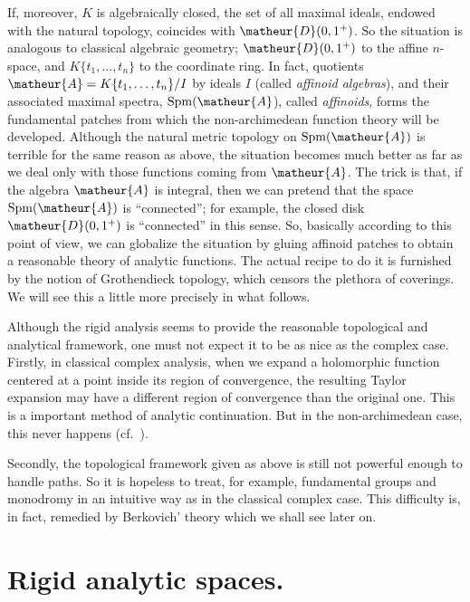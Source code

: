 If, moreover, $K$ is algebraically closed, the set of all maximal
ideals, endowed with the natural topology, coincides with 
$\matheur{D}(0,1^{+})$.
So the situation is analogous to classical algebraic geometry; 
$\matheur{D}(0,1^{+})$ to the affine $n$-space, and $K\{t_1,\ldots,t_n\}$
to the coordinate ring.
In fact, quotients $\matheur{A}=K\{t_1,\ldots,t_n\}/I$ by ideals $I$ 
(called {\it affinoid algebras}), and their associated maximal spectra,
$\mathrm{Spm}(\matheur{A}$), called {\it affinoids}, forms the 
fundamental patches from which the non-archimedean function theory will be
developed.
Although the natural metric topology on $\mathrm{Spm}(\matheur{A})$ is 
terrible for the same reason as above, the situation becomes much
better as far as we deal only with those functions coming from 
$\matheur{A}$.
The trick is that, if the algebra $\matheur{A}$ is integral, then we can
pretend that the space $\mathrm{Spm}(\matheur{A})$ is ``connected''; for
example, the closed disk $\matheur{D}(0,1^{+})$ is ``connected'' in this
sense.
So, basically according to this point of view, we can globalize 
the situation by gluing affinoid patches to obtain a reasonable
theory of analytic functions.
The actual recipe to do it is furnished by the notion of Grothendieck
topology, which censors the plethora of coverings.
We will see this a little more precisely in what follows.

\begin{apprem}
Although the rigid analysis seems to provide the reasonable topological
and analytical framework, one must not expect it to be as nice as the
complex case.  Firstly, in classical complex analysis, when we expand
a holomorphic function centered at a point inside its region of
convergence, the resulting Taylor expansion may have a different region
of convergence than the original one. This is a important method of
analytic continuation.  But in the non-archimedean case,
this never happens (cf.\ \cite[4.4]{pn}).

Secondly, the topological framework
given as above is still not powerful enough to handle paths.
So it is hopeless to treat, for example, fundamental groups and 
monodromy in an intuitive way as in the classical complex case.
This difficulty is, in fact, remedied by Berkovich' theory 
which we shall see later on.
\end{apprem}

%
\section{Rigid analytic spaces.}
%

